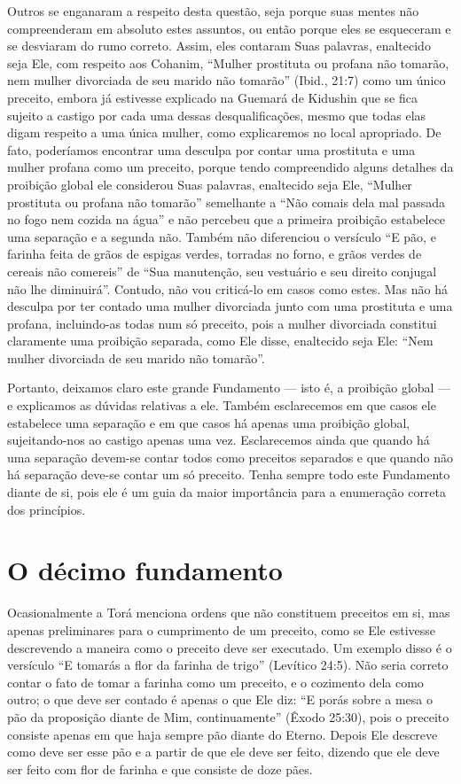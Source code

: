 Outros se enganaram a respeito desta questão, seja porque suas mentes
não compreenderam em absoluto estes assuntos, ou então porque eles se
esqueceram e se desviaram do rumo correto. Assim, eles contaram Suas
palavras, enaltecido seja Ele, com respeito aos Cohanim, ``Mulher
prostituta ou profana não tomarão, nem mulher divorciada de seu marido
não tomarão'' (Ibid., 21:7) como um único preceito, embora já estivesse
explicado na Guemará de Kidushin que se fica sujeito a castigo por cada
uma dessas desqualificações, mesmo que todas elas digam respeito a uma
única mulher, como explicaremos no local apropriado. De fato, poderíamos
encontrar uma desculpa por contar uma
prostituta e uma mulher profana como um preceito, porque tendo
compreendido alguns detalhes da proibição global ele considerou Suas
palavras, enaltecido seja Ele, ``Mulher prostituta ou profana não
tomarão'' semelhante a ``Não comais dela mal passada no fogo nem cozida
na água'' e não percebeu que a primeira proibição estabelece uma
separação e a segunda não. Também não diferenciou o versículo ``E pão,
e farinha feita de grãos de espigas verdes, torradas no forno, e grãos
verdes de cereais não comereis'' de ``Sua manutenção, seu vestuário e
seu direito conjugal não lhe diminuirá''. Contudo, não vou criticá-lo
em casos como estes. Mas não há desculpa por ter contado uma mulher
divorciada junto com uma prostituta e uma profana, incluindo-as todas
num só preceito, pois a mulher divorciada constitui claramente uma
proibição separada, como Ele disse, enaltecido seja Ele: ``Nem mulher
divorciada de seu marido não tomarão''.

Portanto, deixamos claro este grande Fundamento --- isto é, a proibição
global --- e explicamos as dúvidas relativas a ele. Também esclarecemos
em que casos ele estabelece uma separação e em que casos há apenas uma
proibição global, sujeitando-nos ao castigo apenas uma vez.
Esclarecemos ainda que quando há uma separação devem-se contar todos
como preceitos separados e que quando não há separação deve-se contar um
só preceito. Tenha sempre todo este Fundamento diante de si, pois ele é
um guia da maior importância para a enumeração correta dos princípios.

\chapter*{O décimo fundamento}

Ocasionalmente a Torá menciona ordens que não constituem preceitos em
si, mas apenas preliminares para o cumprimento de um preceito, como se
Ele estivesse descrevendo a maneira como o preceito deve ser executado.
Um exemplo disso é o versículo ``E tomarás a flor da farinha de trigo''
(Levítico 24:5). Não seria correto contar o fato de tomar a farinha
como um preceito, e o cozimento dela como outro; o que deve ser contado
é apenas o que Ele diz: ``E porás sobre a mesa o pão da proposição
diante de Mim, continuamente'' (Êxodo 25:30), pois o preceito consiste
apenas em que haja sempre pão diante do Eterno. Depois Ele descreve como
deve ser esse pão e a partir de que ele deve ser feito, dizendo que ele
deve ser feito com flor de farinha e que consiste de doze pães.

